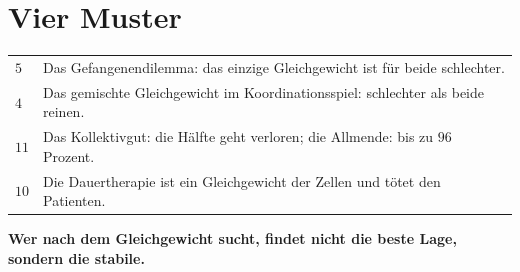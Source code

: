 \section{Vier Muster}

\begin{merksatz}
\begin{center}
{\small
\renewcommand{\arraystretch}{1.48}
\begin{tabular}{@{}P{1.8cm}P{6.6cm}@{}}
\toprule
$5$ & Das Gefangenendilemma: das einzige Gleichgewicht ist für beide schlechter.\\
$4$ & Das gemischte Gleichgewicht im Koordinationsspiel: schlechter als beide reinen.\\
$11$ & Das Kollektivgut: die Hälfte geht verloren; die Allmende: bis zu $96$ Prozent.\\
$10$ & Die Dauertherapie ist ein Gleichgewicht der Zellen und tötet den Patienten.\\
\bottomrule
\end{tabular}}
\end{center}

\begin{center}
\begin{minipage}{0.9\textwidth}
\textbf{Wer nach dem Gleichgewicht sucht, findet nicht die beste Lage, sondern die stabile.}
\end{minipage}
\end{center}

\begin{center}
\begin{minipage}{0.88\textwidth}
\end{minipage}
\end{center}
\end{merksatz}


